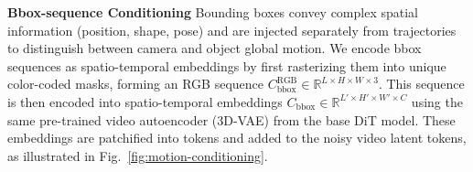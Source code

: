 \noindent\textbf{Bbox-sequence Conditioning}
Bounding boxes convey complex spatial information (position, shape, pose) and are injected separately from trajectories to distinguish between camera and object global motion. 
We encode bbox sequences as spatio-temporal embeddings by first rasterizing them into unique color-coded masks, forming an RGB sequence $C_\text{bbox}^\text{RGB}\in \mathbb{R}^{L\times H\times W\times 3}$.
This sequence is then encoded into spatio-temporal embeddings $C_\text{bbox}\in \mathbb{R}^{L'\times H'\times W'\times C}$ using the same pre-trained video autoencoder (3D-VAE) from the base DiT model. These embeddings are patchified into tokens and added to the noisy video latent tokens, as illustrated in Fig.~\ref{fig:motion-conditioning}.

